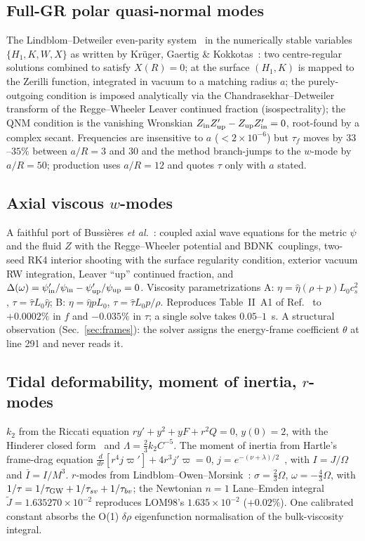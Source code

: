 \documentclass[aps,prd,preprint,amsmath,amssymb,nofootinbib,longbibliography]{revtex4-2}
\newcommand{\cs}{c_s}
\newcommand{\BDNK}{BDNK}
\begin{document}
\subsection{Full-GR polar quasi-normal modes}
The Lindblom--Detweiler even-parity system~\cite{DetweilerLindblom1985} in the numerically stable
variables $\{H_1,K,W,X\}$ as written by Kr\"uger, Gaertig \& Kokkotas~\cite{KGK2011}: two
centre-regular solutions combined to satisfy $X(R)=0$; at the surface $(H_1,K)$ is mapped to the
Zerilli function, integrated in vacuum to a matching radius $a$; the purely-outgoing condition is
imposed analytically via the Chandrasekhar--Detweiler transform of the Regge--Wheeler Leaver
continued fraction (isospectrality); the QNM condition is the vanishing Wronskian
$Z_{\rm in}Z'_{\rm up} - Z_{\rm up}Z'_{\rm in} = 0$, root-found by a complex secant. Frequencies
are insensitive to $a$ ($<2\times10^{-6}$) but $\tau_f$ moves by $33$--$35\%$ between
$a/R = 3$ and $30$ and the method branch-jumps to the $w$-mode by $a/R=50$; production uses
$a/R=12$ and quotes $\tau$ only with $a$ stated.

\subsection{Axial viscous $w$-modes}
A faithful port of Bussi\`eres \emph{et al.}~\cite{Bussieres2026}: coupled axial wave equations
for the metric $\psi$ and the fluid $Z$ with the Regge--Wheeler potential and \BDNK\ couplings,
two-seed RK4 interior shooting with the surface regularity condition, exterior vacuum RW
integration, Leaver ``up'' continued fraction, and $\Delta(\omega) = \psi'_{\rm in}/\psi_{\rm in}
- \psi'_{\rm up}/\psi_{\rm up} = 0$. Viscosity parametrizations A: $\eta = \hat\eta(\rho+p)L_0\cs^2$,
$\tau = \hat\tau L_0\hat\eta$; B: $\eta = \hat\eta pL_0$, $\tau = \hat\tau L_0 p/\rho$.
Reproduces Table~II~A1 of Ref.~\cite{Bussieres2026} to $+0.0002\%$ in $f$ and $-0.035\%$ in
$\tau$; a single solve takes $0.05$--$1$~s. A structural observation (Sec.~\ref{sec:frames}):
the solver assigns the energy-frame coefficient $\theta$ at line 291 and never reads it.

\subsection{Tidal deformability, moment of inertia, $r$-modes}
$k_2$ from the Riccati equation $ry' + y^2 + yF + r^2Q = 0$, $y(0)=2$, with the
Hinderer closed form~\cite{Hinderer2008,Postnikov2010} and $\Lambda = \tfrac23k_2C^{-5}$. The moment
of inertia from Hartle's frame-drag equation $\frac{d}{dr}[r^4 j\varpi'] + 4r^3j'\varpi = 0$,
$j = e^{-(\nu+\lambda)/2}$~\cite{Hartle1967}, with $I = J/\Omega$ and $\bar I = I/M^3$.
$r$-modes from Lindblom--Owen--Morsink~\cite{LOM1998}: $\sigma = \tfrac23\Omega$,
$\omega = -\tfrac43\Omega$, with $1/\tau = 1/\tau_{\rm GW} + 1/\tau_{sv} + 1/\tau_{bv}$; the
Newtonian $n=1$ Lane--Emden integral $\tilde J = 1.635270\times10^{-2}$ reproduces LOM98's
$1.635\times10^{-2}$ ($+0.02\%$). One calibrated constant absorbs the O(1) $\delta\rho$
eigenfunction normalisation of the bulk-viscosity integral.
\end{document}
